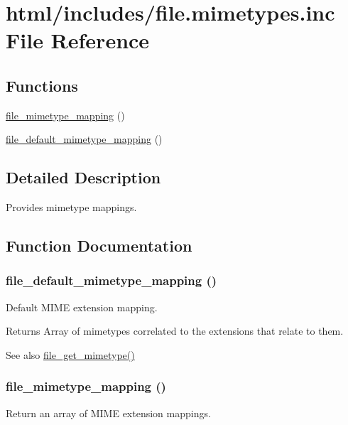 \hypertarget{file_8mimetypes_8inc}{
\section{html/includes/file.mimetypes.inc File Reference}
\label{file_8mimetypes_8inc}
}
\subsection*{Functions}
\begin{DoxyCompactItemize}
\item 
\hyperlink{file_8mimetypes_8inc_a92dcd553bb93d58cd4e25c1dc64c7386}{file\_\-mimetype\_\-mapping} ()
\item 
\hyperlink{file_8mimetypes_8inc_a8a8064ffcafb048d0c7dd61ba261b876}{file\_\-default\_\-mimetype\_\-mapping} ()
\end{DoxyCompactItemize}


\subsection{Detailed Description}
Provides mimetype mappings. 

\subsection{Function Documentation}
\hypertarget{file_8mimetypes_8inc_a8a8064ffcafb048d0c7dd61ba261b876}{
\subsubsection[{file\_\-default\_\-mimetype\_\-mapping}]{\setlength{\rightskip}{0pt plus 5cm}file\_\-default\_\-mimetype\_\-mapping ()}}
\label{file_8mimetypes_8inc_a8a8064ffcafb048d0c7dd61ba261b876}
Default MIME extension mapping.

\begin{DoxyReturn}{Returns}
Array of mimetypes correlated to the extensions that relate to them.
\end{DoxyReturn}
\begin{DoxySeeAlso}{See also}
\hyperlink{group__file_ga2f3c500f59ecd606e4022ed9d83a1dec}{file\_\-get\_\-mimetype()} 
\end{DoxySeeAlso}
\hypertarget{file_8mimetypes_8inc_a92dcd553bb93d58cd4e25c1dc64c7386}{
\subsubsection[{file\_\-mimetype\_\-mapping}]{\setlength{\rightskip}{0pt plus 5cm}file\_\-mimetype\_\-mapping ()}}
\label{file_8mimetypes_8inc_a92dcd553bb93d58cd4e25c1dc64c7386}
Return an array of MIME extension mappings.

